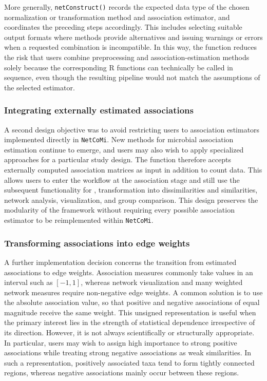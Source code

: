 More generally, \texttt{netConstruct()} records the expected data type of the chosen normalization or transformation method and association estimator, and coordinates the preceding steps accordingly. This includes selecting suitable output formats where methods provide alternatives and issuing warnings or errors when a requested combination is incompatible. In this way, the function reduces the risk that users combine preprocessing and association-estimation methods solely because the corresponding R functions can technically be called in sequence, even though the resulting pipeline would not match the assumptions of the selected estimator.

\subsubsection*{Integrating externally estimated associations}

A second design objective was to avoid restricting users to association estimators implemented directly in \texttt{NetCoMi}. New methods for microbial association estimation continue to emerge, and users may also wish to apply specialized approaches  for a particular study design. The function therefore accepts externally computed association matrices as input in addition to count data. This allows users to enter the workflow at the association stage and still use the subsequent functionality for , transformation into dissimilarities and similarities, network analysis, visualization, and group comparison. This design preserves the modularity of the framework without requiring every possible association estimator to be reimplemented within \texttt{NetCoMi}.

\subsubsection*{Transforming associations into edge weights}

A further implementation decision concerns the transition from estimated associations to edge weights. Association measures commonly take values in an interval such as $[-1,1]$, whereas network visualization and many weighted network measures require non-negative edge weights. A common solution is to use the absolute association value, so that positive and negative associations of equal magnitude receive the same weight. This unsigned representation is useful when the primary interest lies in the strength of statistical dependence irrespective of its direction. However, it is not always scientifically or structurally appropriate. In particular, users may wish to assign high importance to strong positive associations while treating strong negative associations as weak similarities. In such a representation, positively associated taxa tend to form tightly connected regions, whereas negative associations mainly occur between these regions.

